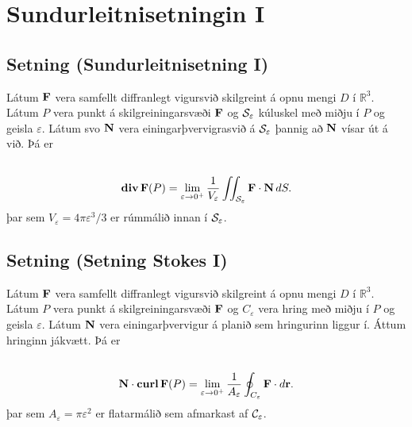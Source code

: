 \documentclass[a4paper,10pt,icelandic]{sphinxmanual}
\begin{document}
\section{Sundurleitnisetningin I}
\label{Kafli6:sundurleitnisetningin-i}

\subsection{Setning (Sundurleitnisetning I)}
\label{Kafli6:setning-sundurleitnisetning-i}
Látum \(\mbox{${\bf F}$}\) vera samfellt diffranlegt vigursvið
skilgreint á opnu mengi \(D\) í \({\mathbb  R}^3\). Látum
\(P\) vera punkt á skilgreiningarsvæði \(\mbox{${\bf F}$}\) og
\({\cal S}_\varepsilon\) kúluskel með miðju í \(P\) og geisla
\(\varepsilon\). Látum svo \(\mbox{${\bf N}$}\) vera
einingarþvervigrasvið á \({\cal S}_\varepsilon\) þannig að
\(\mbox{${\bf N}$}\) vísar út á við. Þá er
\begin{gather}
\begin{split}\displaystyle\end{split}\notag\\\begin{split}\mbox{${\rm\bf div\,}$}\mbox{${\bf F}$}(P)=\lim_{\varepsilon\rightarrow 0^+}
\frac{1}{V_\varepsilon}\int\!\!\!\int_{{\cal S}_\varepsilon}\mbox{${\bf F}$}\cdot\mbox{${\bf N}$}\,dS.\end{split}\notag
\end{gather}
þar sem \(V_\varepsilon= 4\pi\varepsilon^3/3\) er rúmmálið innan í
\({\cal S}_\varepsilon\).


\subsection{Setning (Setning Stokes I)}
\label{Kafli6:setning-setning-stokes-i}
Látum \(\mbox{${\bf F}$}\) vera samfellt diffranlegt vigursvið
skilgreint á opnu mengi \(D\) í \({\mathbb  R}^3\). Látum
\(P\) vera punkt á skilgreiningarsvæði \(\mbox{${\bf F}$}\) og
\(C_\varepsilon\) vera hring með miðju í \(P\) og geisla
\(\varepsilon\). Látum \(\mbox{${\bf N}$}\) vera
einingarþvervigur á planið sem hringurinn liggur í. Áttum hringinn
jákvætt. Þá er
\begin{gather}
\begin{split}\displaystyle\end{split}\notag\\\begin{split}\mbox{${\bf N}$}\cdot\mbox{${\rm\bf curl\,}$}\mbox{${\bf F}$}(P)=\lim_{\varepsilon\rightarrow 0^+}
\frac{1}{A_\varepsilon}\oint_{C_\varepsilon}\mbox{${\bf F}$}\cdot d\mbox{${\bf r}$}.\end{split}\notag
\end{gather}
þar sem \(A_\varepsilon= \pi\varepsilon^2\) er flatarmálið sem
afmarkast af \({\cal C}_\varepsilon\).
\end{document}
